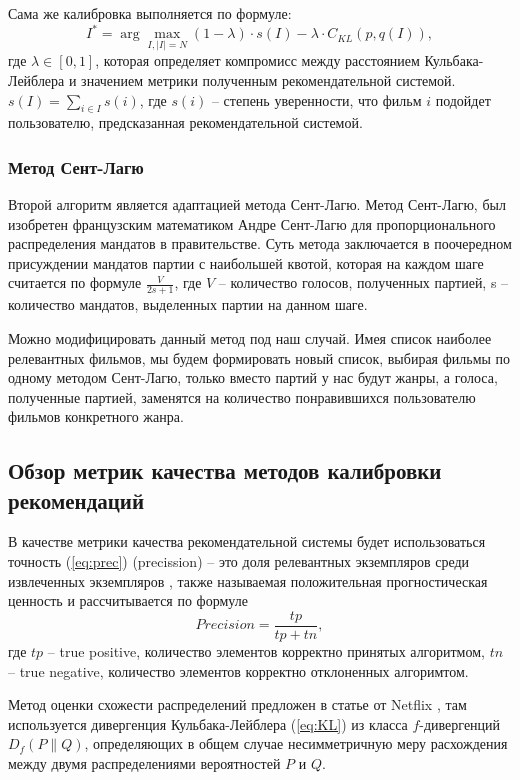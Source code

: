 Сама же калибровка выполняется по формуле: 
\begin{equation}
  \label{eq:Calibrated}
  I^*=\arg \max_{I, |I|=N} (1-\lambda) \cdot s(I) - \lambda \cdot C_{KL}(p,q(I)),
\end{equation} где $\lambda \in [0,1]$, которая определяет 
компромисс между расстоянием Кульбака-Лейблера и значением 
метрики полученным рекомендательной системой. $s(I)=\sum_{i\in I}s(i)$, 
где $s(i)$ -- степень уверенности, что фильм $i$ подойдет 
пользователю, предсказанная рекомендательной системой.
\subsubsection{Метод Сент-Лагю}
Второй алгоритм является адаптацией метода Сент-Лагю. \cite{bib5} 
Метод Сент-Лагю, был изобретен французским математиком Андре 
Сент-Лагю для пропорционального распределения мандатов в 
правительстве. Суть метода заключается в поочередном присуждении 
мандатов партии с наибольшей квотой, которая на каждом шаге 
считается по формуле $\frac{V}{2s+1}$, где $V$ -- количество 
голосов, полученных партией, s -- количество мандатов, 
выделенных партии на данном шаге.

Можно модифицировать данный метод под наш случай. 
Имея список наиболее релевантных фильмов, мы будем 
формировать новый список, выбирая фильмы по одному 
методом Сент-Лагю, только вместо партий у нас будут 
жанры, а голоса, полученные партией, заменятся на количество 
понравившихся пользователю фильмов конкретного жанра.

\subsection{Обзор метрик качества методов калибровки рекомендаций}
В качестве метрики качества рекомендательной системы будет 
использоваться точность (\ref{eq:prec}) (precission) --  это доля релевантных экземпляров 
среди извлеченных экземпляров \cite{bib6}, также называемая положительная 
прогностическая ценность и рассчитывается по формуле \begin{equation}
    Precision = \frac{tp}{tp+tn},
    \label{eq:prec}
  \end{equation}
  где ${tp}$ -- true positive, количество элементов корректно принятых алгоритмом, 
  ${tn}$ -- true negative, количество элементов корректно отклоненных алгоримтом. 
  
  Метод оценки схожести распределений предложен в статье от Netflix \cite{bib4}, 
  там используется дивергенция Кульбака-Лейблера (\ref{eq:KL}) из класса ${f}$-дивергенций ${\displaystyle D_{f}(P\parallel Q)}$,  определяющих в общем случае несимметричную меру расхождения между двумя распределениями вероятностей ${P}$ и ${Q}$.

